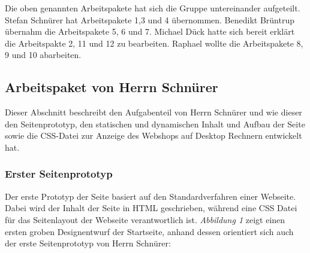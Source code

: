 Die oben genannten Arbeitspakete hat sich die Gruppe untereinander aufgeteilt. Stefan Schnürer hat Arbeitspakete 1,3 und 4 übernommen. Benedikt Brüntrup übernahm die Arbeitspakete 5, 6 und 7. Michael Dück hatte sich bereit erklärt die Arbeitspakte 2, 11 und 12 zu bearbeiten. Raphael wollte die Arbeitspakete 8, 9 und 10 abarbeiten.



\newpage
\subsection{Arbeitspaket von Herrn Schnürer}

Dieser Abschnitt beschreibt den Aufgabenteil von Herrn Schnürer und wie dieser den Seitenprototyp, den statischen und dynamischen Inhalt und Aufbau der Seite sowie die CSS-Datei zur Anzeige des Webshops auf Desktop Rechnern entwickelt hat.


\subsubsection{Erster Seitenprototyp}

Der erste Prototyp der Seite basiert auf den Standardverfahren einer Webseite. Dabei wird der Inhalt der Seite in HTML geschrieben, während eine CSS Datei für das Seitenlayout der Webseite verantwortlich ist. \textit{Abbildung 1} zeigt einen ersten groben Designentwurf der Startseite, anhand dessen orientiert sich auch der erste Seitenprototyp von Herrn Schnürer:

